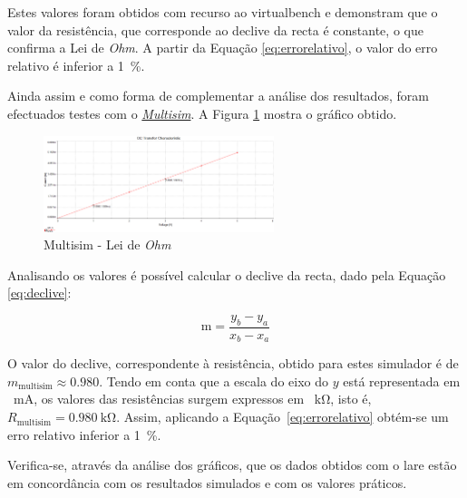 Estes valores foram obtidos com recurso ao \acrshort{virtualbench} e demonstram que o valor da resistência, que corresponde ao declive da recta é constante, o que confirma a Lei de \textit{Ohm}. A partir da Equação \ref{eq:errorelativo}, o valor do erro relativo é inferior a \SI{1}{\percent}. 

Ainda assim e como forma de complementar a análise dos resultados, foram efectuados testes com o \href{https://www.multisim.com}{\textit{Multisim}}. A Figura \ref{fig:multisimOHM} mostra o gráfico obtido.

\begin{figure}[hbtp]
	\centering
	\includegraphics[width=0.6\textwidth]{figures/OHM_resultado_multisim.png}
	\caption{Multisim - Lei de \textit{Ohm}}
	\label{fig:multisimOHM}
\end{figure}

Analisando os valores é possível calcular o declive da recta, dado pela Equação \ref{eq:declive}:

\begin{equation} \label{eq:declive}
	\text{m} = \frac{y_{b} - y_{a}}{x_{b} - x_{a}}
\end{equation}

O valor do declive, correspondente à resistência, obtido para estes simulador é de $m_\text{{multisim}} \approx{0.980}$. Tendo em conta que a escala do eixo do $y$ está representada em \SI{}{\milli\ampere}, os valores das resistências surgem expressos em \SI{}{\kilo\ohm}, isto é, $R_\text{{multisim}} = \SI{0.980}{\kilo\ohm}$. Assim, aplicando a Equação~\ref{eq:errorelativo} obtém-se um erro relativo inferior a \SI{1}{\percent}.

Verifica-se, através da análise dos gráficos, que os dados obtidos com o \acrshort{lare} estão em concordância com os resultados simulados e com os valores práticos.

